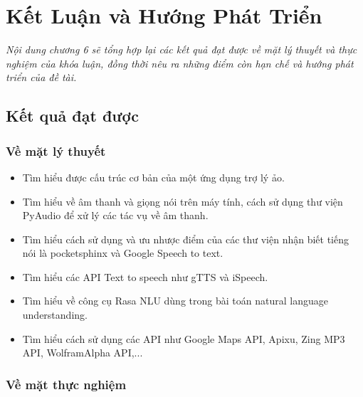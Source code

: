 \chapter{Kết Luận và Hướng Phát Triển}
\ifpdf
    \graphicspath{{Conclusions/ConclusionsFigs/PNG/}{Conclusions/ConclusionsFigs/PDF/}{Conclusions/ConclusionsFigs/}}
\else
    \graphicspath{{Conclusions/ConclusionsFigs/EPS/}{Conclusions/ConclusionsFigs/}}
\fi

\textit{Nội dung chương 6 sẽ tổng hợp lại các kết quả đạt được về mặt lý thuyết và thực nghiệm của khóa luận, đồng thời nêu ra những điểm còn hạn chế và hướng phát triển của đề tài.}

\section{Kết quả đạt được}

\subsection{Về mặt lý thuyết}

\begin{itemize}
    \item Tìm hiểu được cấu trúc cơ bản của một ứng dụng trợ lý ảo.
    \item Tìm hiểu về âm thanh và giọng nói trên máy tính, cách sử dụng thư viện PyAudio để xử lý các tác vụ về âm thanh.
    \item Tìm hiểu cách sử dụng và ưu nhược điểm của các thư viện nhận biết tiếng nói là pocketsphinx và Google Speech to text.
    \item Tìm hiểu các API Text to speech như gTTS và iSpeech.
    \item Tìm hiểu về công cụ Rasa NLU dùng trong bài toán natural language understanding.
    \item Tìm hiểu cách sử dụng các API như Google Maps API, Apixu, Zing MP3 API, WolframAlpha API,...
\end{itemize}

\subsection{Về mặt thực nghiệm}

